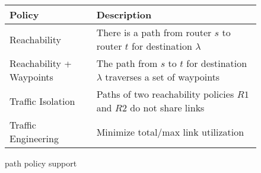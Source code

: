 \begin{wrapfigure}{r}{0.51\textwidth}
\vspace{-3mm}
\small
\begin{minipage}{\linewidth}
	\begin{tabular}{m{5.8em}  m{14em} } 
		{\bf Policy} & {\bf Description} \\ 
		\hline
		Reachability & There is a path from router $s$ to router $t$ for destination $\lambda$ \\ \hline
		Reachability + \newline Waypoints & The path  from $s$ to $t$ for destination $\lambda$ 
		traverses a set of waypoints\\ \hline
		Traffic \newline Isolation & Paths of two reachability policies $R1$ and $R2$ do not share  links \\ \hline
		Traffic \newline Engineering  & Minimize total/max link utilization \\
	\end{tabular}
	\end{minipage}
\caption{\name path policy support}
	\label{tab:policysupport}
\end{wrapfigure}